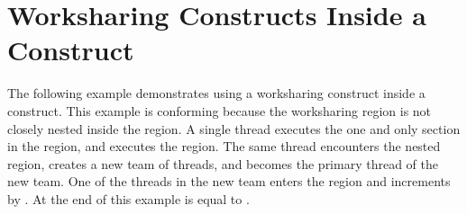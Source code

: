 \pagebreak
\section{Worksharing Constructs Inside a  Construct}
\label{sec:worksharing_critical}

The following example demonstrates using a worksharing construct inside a  
construct. This example is conforming because the worksharing   
region is not closely nested inside the  region. A single thread 
executes the one and only section in the  region, and executes 
the  region. The same thread encounters the nested  
region, creates a new team of threads, and becomes the primary thread of the new team. 
One of the threads in the new team enters the  region and increments 
 by . At the end of this example  is equal to .




